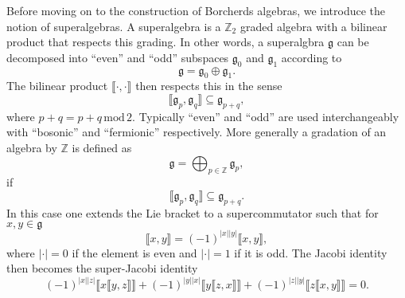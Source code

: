 Before moving on to the construction of Borcherds algebras, we introduce the notion of superalgebras. A superalgebra is a $\mathbb{Z}_2$ graded algebra with a bilinear product that respects this grading. In other words, a superalgbra $\mathfrak{g}$ can be decomposed into ``even'' and ``odd'' subspaces $\mathfrak{g}_0$ and $\mathfrak{g}_1$ according to 
\begin{equation}
    \mathfrak{g} = \mathfrak{g}_0\oplus\mathfrak{g}_1.
\end{equation}
The bilinear product $\llbracket\cdot,\cdot\rrbracket$ then respects this in the sense
\begin{equation}
    \llbracket\mathfrak{g}_p,\mathfrak{g}_q\rrbracket \subseteq \mathfrak{g}_{p+q},
\end{equation}
where $p+q = p+q\,\text{mod}\,2$. Typically ``even'' and ``odd'' are used interchangeably with ``bosonic'' and ``fermionic'' respectively. More generally a gradation of an algebra by $\mathbb{Z}$ is defined as 
\begin{equation}
    \mathfrak{g} = \bigoplus_{p\in\mathbb{Z}} \mathfrak{g}_{p},
\end{equation}
if
\begin{equation}
    \llbracket \mathfrak{g}_p,\mathfrak{g}_q\rrbracket\subseteq \mathfrak{g}_{p+q}.
\end{equation}
In this case one extends the Lie bracket to a supercommutator such that for $x,y\in\mathfrak{g}$
\begin{equation}
    \llbracket x,y\rrbracket = \left(-1\right)^{|x||y|}\llbracket x,y\rrbracket,
\end{equation}
where $|\cdot|=0$ if the element is even and $|\cdot|=1$ if it is odd. The Jacobi identity then becomes the super-Jacobi identity
\begin{equation}
    \left(-1\right)^{|x||z|}\llbracket x\llbracket y,z\rrbracket\rrbracket +\left(-1\right)^{|y||x|}\llbracket y\llbracket z,x\rrbracket\rrbracket+\left(-1\right)^{|z||y|}\llbracket z\llbracket x,y\rrbracket\rrbracket = 0.
\end{equation}


